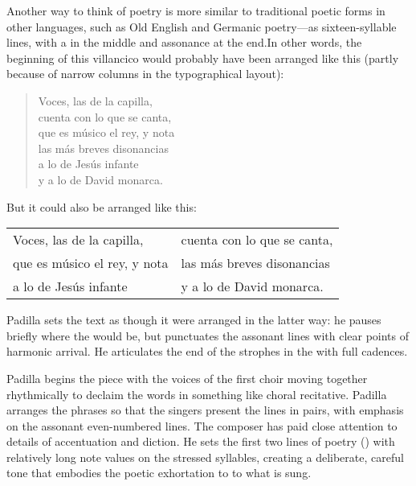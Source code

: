 Another way to think of  poetry is more similar to traditional
poetic forms in other languages, such as Old English and Germanic poetry---as
sixteen-syllable lines, with a  in the middle and assonance at the
end.
In other words, the beginning of this villancico would probably have been
arranged like this (partly because of narrow columns in the typographical
layout):

\begin{blockquotation}
\begin{verse}
    Voces, las de la capilla,\\
    cuenta con lo que se canta,\\
    que es músico el rey, y nota\\
    las más breves disonancias\\
    a lo de Jesús infante\\
    y a lo de David monarca.
\end{verse}
\end{blockquotation}

But it could also be arranged like this:
\begin{blockquotation}
\begin{tabular}{l@{\quad}l}
    Voces, las de la capilla, & cuenta con lo que se canta,\\
    que es músico el rey, y nota & las más breves disonancias\\
    a lo de Jesús infante  & y a lo de David monarca.
\end{tabular}
\end{blockquotation}

Padilla sets the text as though it were arranged in the latter way: he pauses
briefly where the  would be, but punctuates the assonant lines
with clear points of harmonic arrival.
He articulates the end of the strophes in the  with full
cadences.

Padilla begins the piece with the voices of the first choir moving together
rhythmically to declaim the words in something like choral recitative.
Padilla arranges the phrases so that the singers present the lines in pairs,
with emphasis on the assonant even-numbered lines.
The composer has paid close attention to details of accentuation and diction.
He sets the first two lines of poetry () with relatively long
note values on the stressed syllables, creating a deliberate, careful tone that
embodies the poetic exhortation to  to what is sung. 

